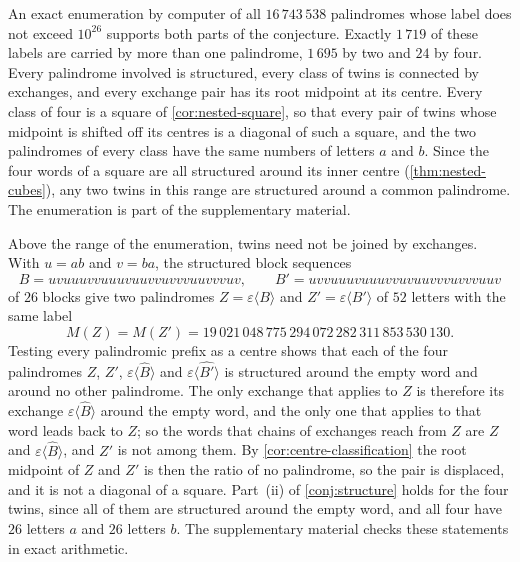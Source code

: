 An exact enumeration by computer of all $16\,743\,538$ palindromes whose label does not exceed
$10^{26}$ supports both parts of the conjecture. Exactly $1\,719$ of these labels are
carried by more than one palindrome, $1\,695$ by two and $24$ by four. Every palindrome
involved is structured, every class of twins is connected by exchanges, and every exchange
pair has its root midpoint at its centre. Every class of four is a square of
\cref{cor:nested-square}, so that every pair of twins whose midpoint is shifted off its centres is
a diagonal of such a square, and the two palindromes of every class have the same numbers of
letters $a$ and $b$. Since the four words of a square are all structured around its inner centre
(\cref{thm:nested-cubes}), any two twins in this range are structured around a common palindrome.
The enumeration is part of the supplementary material.

\begin{remark}
\label{rem:chain-form}
Above the range of the enumeration, twins need not be joined by exchanges. With $u=ab$ and
$v=ba$, the structured block sequences
$$
 B=uvuuuvvuuuvuuvvuvvvuuvvvuv,\qquad B'=uvvuuuvuuuvvuvuuvvvuvvvuuv
$$
of $26$ blocks give two palindromes $Z=\varepsilon\langle B\rangle$ and $Z'=\varepsilon\langle B'\rangle$
of $52$ letters with the same label
$$
 M(Z)=M(Z')=19\,021\,048\,775\,294\,072\,282\,311\,853\,530\,130 .
$$
Testing every palindromic prefix as a centre shows that each of the four palindromes $Z$, $Z'$,
$\varepsilon\langle\widehat B\rangle$ and $\varepsilon\langle\widehat{B'}\rangle$ is structured around
the empty word and around no other palindrome. The only exchange that applies to $Z$ is therefore
its exchange $\varepsilon\langle\widehat B\rangle$ around the empty word, and the only one that applies
to that word leads back to $Z$; so the words that chains of exchanges reach from $Z$ are $Z$ and
$\varepsilon\langle\widehat B\rangle$, and $Z'$ is not among them. By
\cref{cor:centre-classification} the root midpoint of $Z$ and $Z'$ is then the ratio of no
palindrome, so the pair is displaced, and it is not a diagonal of a square. Part~(ii) of
\cref{conj:structure} holds for the four twins, since all of them are structured around the empty
word, and all four have $26$ letters $a$ and $26$ letters $b$. The supplementary material checks
these statements in exact arithmetic.
\end{remark}


